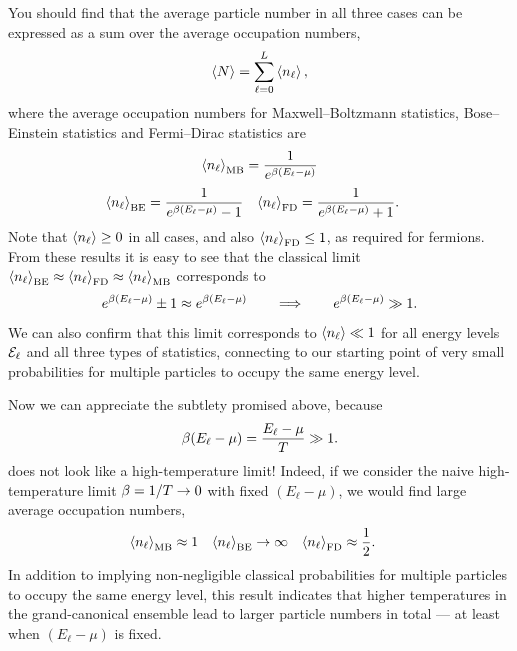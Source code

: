You should find that the average particle number in all three cases can be expressed as a sum over the average occupation numbers,
\begin{equation*}
  \left\langle N \right\rangle = \sum_{\ell = 0}^L \left\langle n_{\ell} \right\rangle,
\end{equation*}
where the average occupation numbers for Maxwell--Boltzmann statistics, Bose--Einstein statistics and Fermi--Dirac statistics are
\begin{equation*}
  \left\langle n_{\ell} \right\rangle_{\text{MB}} = \frac{1}{e^{\beta (E_{\ell} - \mu)}}
\end{equation*}
\begin{align*}
  \left\langle n_{\ell} \right\rangle_{\text{BE}} & = \frac{1}{e^{\beta (E_{\ell} - \mu)} - 1} &
  \left\langle n_{\ell} \right\rangle_{\text{FD}} & = \frac{1}{e^{\beta (E_{\ell} - \mu)} + 1}.
\end{align*}
Note that $\left\langle n_{\ell} \right\rangle \geq 0$ in all cases, and also $\left\langle n_{\ell} \right\rangle_{\text{FD}} \leq 1$, as required for fermions.
From these results it is easy to see that the classical limit $\left\langle n_{\ell} \right\rangle_{\text{BE}} \approx \left\langle n_{\ell} \right\rangle_{\text{FD}} \approx \left\langle n_{\ell} \right\rangle_{\text{MB}}$ corresponds to
\begin{equation*}
  e^{\beta (E_{\ell} - \mu)} \pm 1 \approx e^{\beta (E_{\ell} - \mu)} \qquad \Longrightarrow \qquad e^{\beta (E_{\ell} - \mu)} \gg 1.
\end{equation*}
We can also confirm that this limit corresponds to $\left\langle n_{\ell} \right\rangle \ll 1$ for all energy levels $\mathcal E_{\ell}$ and all three types of statistics, connecting to our starting point of very small probabilities for multiple particles to occupy the same energy level.

Now we can appreciate the subtlety promised above, because
\begin{equation}
  \label{eq:highT_ratio}
  \beta (E_{\ell} - \mu) = \frac{E_{\ell} - \mu}{T} \gg 1.
\end{equation}
does not look like a high-temperature limit!
Indeed, if we consider the naive high-temperature limit $\beta = 1 / T \to 0$ with fixed $(E_{\ell} - \mu)$, we would find large average occupation numbers,
\begin{align*}
  \left\langle n_{\ell} \right\rangle_{\text{MB}} & \approx 1 &
  \left\langle n_{\ell} \right\rangle_{\text{BE}} & \to \infty & 
  \left\langle n_{\ell} \right\rangle_{\text{FD}} & \approx \frac{1}{2}.
\end{align*}
In addition to implying non-negligible classical probabilities for multiple particles to occupy the same energy level, this result indicates that higher temperatures in the grand-canonical ensemble lead to larger particle numbers in total --- at least when $(E_{\ell} - \mu)$ is fixed.

